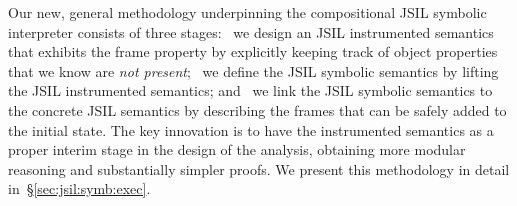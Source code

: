 \documentclass[sigconf, review]{acmart}
\newcommand{\jsil}{JSIL\xspace}
\newcommand{\JSComp}{JS-2-JSIL\xspace}
\newcommand{\cosette}{Cosette\xspace}
\newcommand{\pmaxinline}[1]{ {\color{blue} *** PM : #1 ***} }
\newif\ifComments
\newcommand{\pmax}[1]{%
\ifComments
\begin{center}
\fbox{\begin{minipage}{0.4\textwidth} \color{blue}
{\rm PM: \small #1}
\end{minipage}}
\end{center}
\fi}
\begin{document}
                  
            
Our new, general methodology underpinning the compositional JSIL symbolic
interpreter consists of three stages: ~we design an JSIL
instrumented semantics that exhibits the frame property by explicitly
keeping track of object properties that we know are {\em not present}; 
~we define
the JSIL symbolic semantics by lifting the JSIL instrumented
semantics; and ~we link the JSIL symbolic semantics to the
concrete JSIL semantics by describing the frames that can be safely
added to the initial state.
%
The key innovation is to have the instrumented semantics as a proper
interim stage in the design of the analysis, obtaining more modular
reasoning and substantially simpler proofs. We present this methodology in detail in~\S\ref{sec:jsil:symb:exec}. 













%
\end{document}
